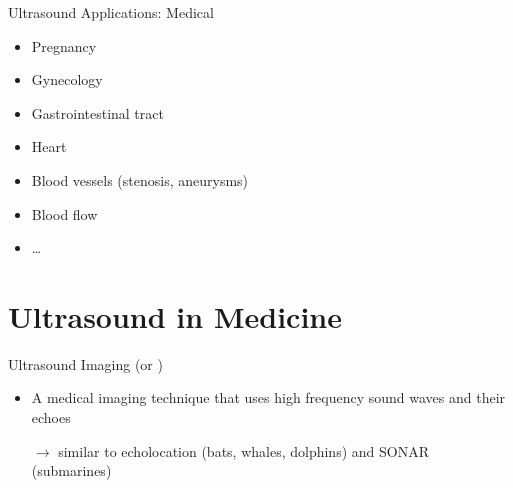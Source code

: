 \begin{frame}[c]{Ultrasound Applications: Medical \cont}
    \begin{itemize}
        \item Pregnancy
        \item Gynecology
        \item Gastrointestinal tract
        \item Heart
        \item Blood vessels (stenosis, aneurysms)
        \item Blood flow
        \item \dots
    \end{itemize}

\end{frame}


\section{Ultrasound in Medicine}


\begin{frame}[c]{Ultrasound Imaging}
     (or )
    \begin{itemize}
        \item A medical imaging technique that uses high frequency sound waves and their echoes
        \item[$\rightarrow$] similar to echolocation (bats, whales, dolphins) and SONAR (submarines)
    \end{itemize}


\end{frame}


